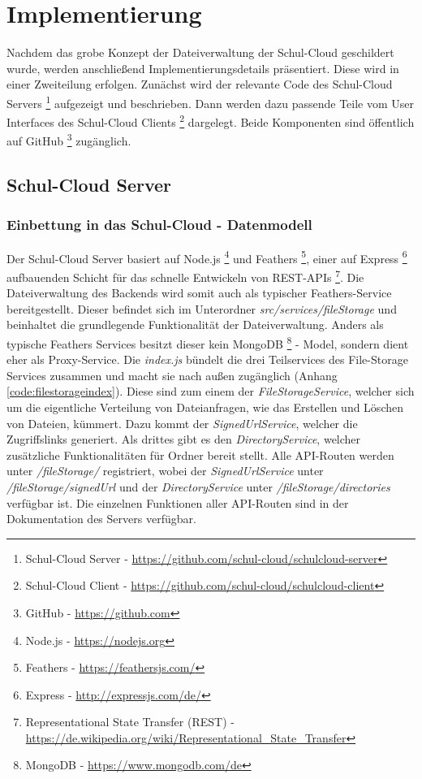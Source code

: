 \section{Implementierung}
\label{sec:implementation}

Nachdem das grobe Konzept der Dateiverwaltung der Schul-Cloud geschildert wurde, werden anschließend Implementierungsdetails präsentiert. Diese wird in einer Zweiteilung erfolgen. Zunächst wird der relevante Code des Schul-Cloud Servers \footnote{Schul-Cloud Server - \url{https://github.com/schul-cloud/schulcloud-server}} aufgezeigt und beschrieben. Dann werden dazu passende Teile vom User Interfaces des Schul-Cloud Clients \footnote{Schul-Cloud Client - \url{https://github.com/schul-cloud/schulcloud-client}} dargelegt. Beide Komponenten sind öffentlich auf GitHub \footnote{GitHub - \url{https://github.com}} zugänglich.

\subsection{Schul-Cloud Server}
\subsubsection{Einbettung in das Schul-Cloud - Datenmodell}

Der Schul-Cloud Server basiert auf Node.js \footnote{Node.js - \url{https://nodejs.org}} und Feathers \footnote{Feathers - \url{https://feathersjs.com/}}, einer auf Express \footnote{Express - \url{http://expressjs.com/de/}} aufbauenden Schicht für das schnelle Entwickeln von REST-APIs \footnote{Representational State Transfer (REST) - \url{https://de.wikipedia.org/wiki/Representational_State_Transfer}}. Die Dateiverwaltung des Backends wird somit auch als typischer Feathers-Service bereitgestellt. Dieser befindet sich im Unterordner \textit{src/services/fileStorage} und beinhaltet die grundlegende Funktionalität der Dateiverwaltung. Anders als typische Feathers Services besitzt dieser kein MongoDB \footnote{MongoDB - \url{https://www.mongodb.com/de}} - Model, sondern dient eher als Proxy-Service. Die \textit{index.js} bündelt die drei Teilservices des File-Storage Services zusammen und macht sie nach außen zugänglich (Anhang \ref{code:filestorageindex}). Diese sind zum einem der \textit{FileStorageService}, welcher sich um die eigentliche Verteilung von Dateianfragen, wie das Erstellen und Löschen von Dateien, kümmert. Dazu kommt der \textit{SignedUrlService}, welcher die Zugriffslinks generiert. Als drittes gibt es den \textit{DirectoryService}, welcher zusätzliche Funktionalitäten für Ordner bereit stellt. Alle API-Routen werden unter \textit{/fileStorage/} registriert, wobei der \textit{SignedUrlService} unter \textit{/fileStorage/signedUrl} und der \textit{DirectoryService} unter \textit{/fileStorage/directories} verfügbar ist. Die einzelnen Funktionen aller API-Routen sind in der Dokumentation des Servers \cite{online:serverswagger} verfügbar. \\

